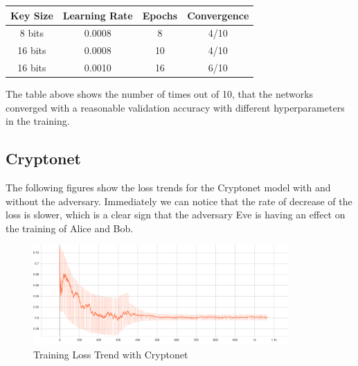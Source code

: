 \documentclass[a4paper]{article}
\begin{document}
  \begin{center}
    \begin{tabular}{ c c c c }
      \hline
      \textbf{Key Size} & \textbf{Learning Rate} & \textbf{Epochs} & \textbf{Convergence} \\ \hline
      8 bits            & 0.0008                 & 8               & 4/10                 \\
      16 bits           & 0.0008                 & 10              & 4/10                 \\
      16 bits           & 0.0010                 & 16              & 6/10                 \\
      \hline
    \end{tabular}
  \end{center}
    
  The table above shows the number of times out of 10, that the networks converged with a 
  reasonable validation accuracy with different hyperparameters in the training.\\

  \subsection{Cryptonet}
  The following figures show the loss trends for the Cryptonet model with and without the adversary.
  Immediately we can notice that the rate of decrease of the loss is slower, which is a clear sign that
  the adversary Eve is having an effect on the training of Alice and Bob.

  \begin{figure}[H]
    \centering
    \includegraphics[height=1.5in]{../../models/cryptonet/graphs/TrainingLoss[S].png}
    \caption{Training Loss Trend with Cryptonet}
    \label{fig:trn_crnet}
  \end{figure} 
\end{document}
